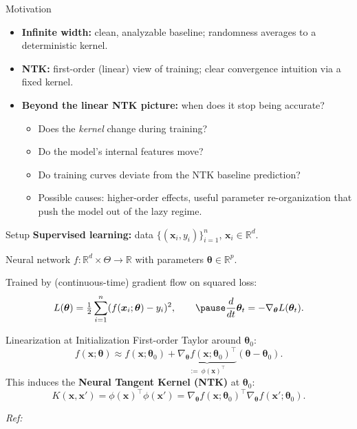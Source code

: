\documentclass[10pt,aspectratio=169]{beamer}
\newcommand{\R}{\mathbb{R}}
\newcommand{\btheta}{\boldsymbol{\theta}}
\newcommand{\bx}{\boldsymbol{x}}
\begin{document}

\begin{frame}{Motivation}
	\begin{itemize}
		\item \textbf{Infinite width:} clean, analyzable baseline; randomness averages to a deterministic kernel.
		      \pause
		\item \textbf{NTK:} first-order (linear) view of training; clear convergence intuition via a fixed kernel.
		      \pause
		\item \textbf{Beyond the linear NTK picture:} when does it stop being accurate?
		      \begin{itemize}
			      \item Does the \emph{kernel} change during training?
			            \pause
			      \item Do the model’s internal features move?
			            \pause
			      \item Do training curves deviate from the NTK baseline prediction?
			            \pause
			      \item Possible causes: higher-order effects, useful parameter
			            re-organization that push the model out of the lazy regime.
		      \end{itemize}
	\end{itemize}
\end{frame}

\begin{frame}{Setup}
	\textbf{Supervised learning:} data $\{(\bx_i,y_i)\}_{i=1}^n$, $\bx_i\in\R^d$.

	\pause
	Neural network $f:\R^d\times\Theta\to\R$ with parameters $\btheta\in\R^p$.
	\pause

	Trained by (continuous-time) gradient flow on squared loss:
	\[
		L(\btheta)=\tfrac{1}{2}\sum_{i=1}^n (f(\bx_i;\btheta)-y_i)^2,
		\qquad
		\pause
		\frac{d}{dt}\btheta_t=-\nabla_{\btheta} L(\btheta_t).
	\]
\end{frame}

\begin{frame}{Linearization at Initialization}
	First-order Taylor around $\btheta_0$:
	\[
		f(\bx;\btheta)\approx f(\bx;\btheta_0)+\underbrace{\nabla_{\btheta} f(\bx;\btheta_0)^{\top}}_{:=~\phi(\bx)^{\top}}(\btheta-\btheta_0).
	\]
	\pause
	This induces the \textbf{Neural Tangent Kernel (NTK)} at $\btheta_0$:
	\[
		K(\bx,\bx')=\phi(\bx)^{\top}\phi(\bx')=\nabla_{\btheta} f(\bx;\btheta_0)^{\top}\nabla_{\btheta} f(\bx';\btheta_0).
	\]

	\vspace{0.4em}
	\footnotesize \emph{Ref:} \citep{jacot2018ntk}\normalsize
\end{frame}
\end{document}
